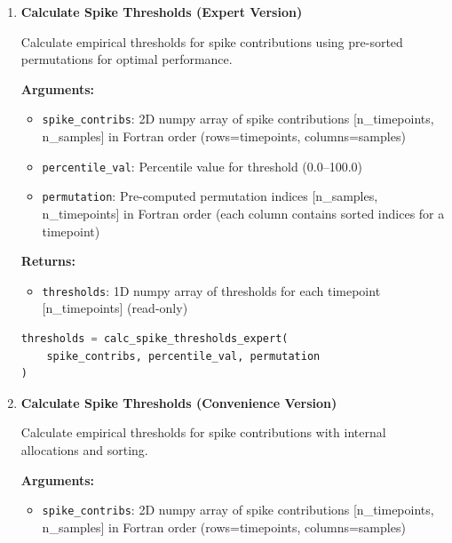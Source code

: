 \begin{enumerate}
\begin{enumerate}
            \item \textbf{Calculate Spike Thresholds (Expert Version)}
                  
                  Calculate empirical thresholds for spike contributions using pre-sorted
                  permutations for optimal performance.
                  
                  \textbf{Arguments:}
                  \begin{itemize}
                    \item \texttt{spike\_contribs}: 2D numpy array of spike contributions
                          [n\_timepoints, n\_samples] in Fortran order (rows=timepoints,
                          columns=samples)
                          
                    \item \texttt{percentile\_val}: Percentile value for threshold (0.0--100.0)
                          
                    \item \texttt{permutation}: Pre-computed permutation indices [n\_samples,
                    n\_timepoints] in Fortran order (each column contains sorted indices
                    for a timepoint)
                  \end{itemize}
                  \textbf{Returns:}
                  \begin{itemize}
                    \item \texttt{thresholds}: 1D numpy array of thresholds for each timepoint
                          [n\_timepoints] (read-only)
                  \end{itemize}
                  \begin{lstlisting}[language=Python, caption={Spike Thresholds Calculation (Expert)}]
thresholds = calc_spike_thresholds_expert(
    spike_contribs, percentile_val, permutation
)
                  \end{lstlisting}
                  
            \item \textbf{Calculate Spike Thresholds (Convenience Version)}
                  
                  Calculate empirical thresholds for spike contributions with internal allocations
                  and sorting.
                  
                  \textbf{Arguments:}
                  \begin{itemize}
                    \item \texttt{spike\_contribs}: 2D numpy array of spike contributions
                          [n\_timepoints, n\_samples] in Fortran order (rows=timepoints,
                          columns=samples)
                          

\end{itemize}
\end{enumerate}
\end{enumerate}
